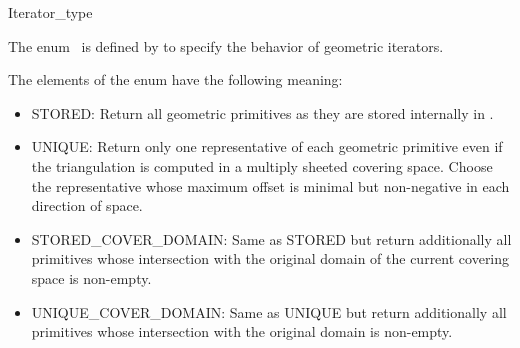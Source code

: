 
\ccModifierCrossRefOff
\begin{ccRefEnum}{Iterator_type}

\ccDefinition
  
The enum \ccRefName\ is defined by  to
specify the behavior of geometric iterators.

{}

The elements of the enum have the following meaning:
\begin{itemize}
\item{STORED:} Return all geometric primitives as they are stored internally
  in .
\item{UNIQUE:} Return only one representative of each geometric
  primitive even if the triangulation is computed in a multiply
  sheeted covering space. Choose the representative whose maximum
  offset is minimal but non-negative in each direction of space. 
\item{STORED\_COVER\_DOMAIN:} Same as STORED but return additionally
  all primitives whose intersection with the original domain of the
  current covering space is non-empty.
\item{UNIQUE\_COVER\_DOMAIN:} Same as UNIQUE but return additionally
  all primitives whose intersection with the original domain is
  non-empty.
\end{itemize}

\ccSeeAlso


\end{ccRefEnum}
\ccModifierCrossRefOn
